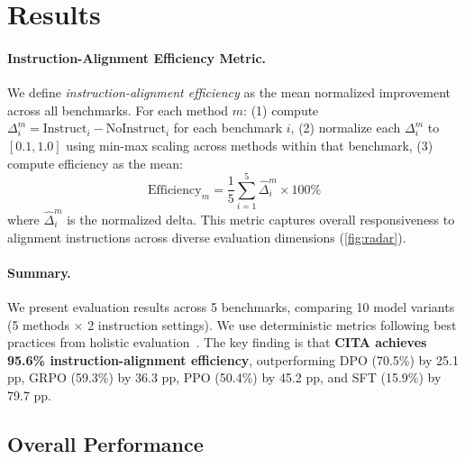 
\vspace{-2mm}
\section{Results}
\label{sec:results}

\paragraph{Instruction-Alignment Efficiency Metric.}
We define \textit{instruction-alignment efficiency} as the mean normalized improvement across all benchmarks. For each method $m$: (1) compute $\Delta_i^m = \text{Instruct}_i - \text{NoInstruct}_i$ for each benchmark $i$, (2) normalize each $\Delta_i^m$ to $[0.1, 1.0]$ using min-max scaling across methods within that benchmark, (3) compute efficiency as the mean:
\begin{equation}
\text{Efficiency}_m = \frac{1}{5}\sum_{i=1}^{5} \hat{\Delta}_i^m \times 100\%
\label{eq:efficiency}
\end{equation}
where $\hat{\Delta}_i^m$ is the normalized delta. This metric captures overall responsiveness to alignment instructions across diverse evaluation dimensions (\cref{fig:radar}).

\paragraph{Summary.}
We present evaluation results across 5 benchmarks, comparing 10 model variants (5 methods $\times$ 2 instruction settings). We use deterministic metrics following best practices from holistic evaluation~\cite{liang2023holistic,sun2024trustllm}. The key finding is that \textbf{CITA achieves \colorbox{bg-green}{95.6\%} instruction-alignment efficiency}, outperforming DPO (70.5\%) by 25.1 pp, GRPO (59.3\%) by 36.3 pp, PPO (50.4\%) by 45.2 pp, and SFT (15.9\%) by 79.7 pp.

\vspace{-2mm}
\subsection{Overall Performance}
\label{sec:overall_results}

